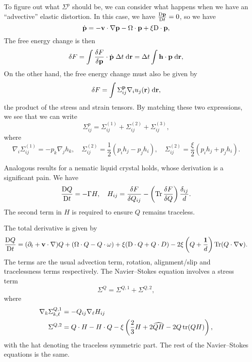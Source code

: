 \documentclass[a4paper]{article}
\begin{document}
To figure out what $\Sigma^p$ should be, we can consider what happens when we have an ``advective'' elastic distortion. In this case, we have $\frac{\mathrm{D} \mathbf{p}}{\mathrm{D} t} = 0$, so we have
\[
  \dot{\mathbf{p}} = - \mathbf{v} \cdot \nabla \mathbf{p} - \Omega \cdot \mathbf{p} + \xi \mathrm{D} \cdot \mathbf{p},
\]
The free energy change is then
\[
  \delta F = \int \frac{\delta F}{\delta \mathbf{p}} \cdot \dot{\mathbf{p}}\; \Delta t \;\mathrm{d} \mathbf{r} = \Delta t \int \mathbf{h} \cdot \mathbf{p} \;\mathrm{d} \mathbf{r},
\]
On the other hand, the free energy change must also be given by
\[
  \delta F = \int \Sigma_{ij}^{\mathbf{p}} \nabla_i u_j(\mathbf{r}) \;\mathrm{d} \mathbf{r},
\]
the product of the stress and strain tensors. By matching these two expressions, we see that we can write
\[
  \Sigma_{ij}^p = \Sigma_{ij}^{(1)} + \Sigma_{ij}^{(2)} + \Sigma_{ij}^{(3)},
\]
where
\[
  \nabla_i \Sigma_{ij}^{(1)} = - p_k \nabla_j h_k,\quad
  \Sigma_{ij}^{(2)} = \frac{1}{2} (p_i h_j - p_j h_i),\quad
  \Sigma_{ij}^{(2)} = \frac{\xi}{2} (p_i h_j + p_j h_i).
\]

Analogous results for a nematic liquid crystal holds, whose derivation is a significant pain. We have
\[
  \frac{\mathrm{D} Q}{\mathrm{D} t} = - \Gamma H,\quad H_{ij} = \frac{\delta F}{\delta Q_{ij}} - \left( \operatorname{Tr}\frac{\delta F}{\delta Q}\right) \frac{\delta_{ij}}{d}.
\]
The second term in $H$ is required to ensure $Q$ remains traceless.

The total derivative is given by
\[
  \frac{\mathrm{D} Q}{\mathrm{D} t} = (\partial_t + \mathbf{v} \cdot \nabla) Q + (\Omega \cdot Q - Q \cdot \omega) + \xi (\mathrm{D} \cdot Q + Q \cdot D) - 2\xi \left(Q + \frac{\mathbf{1}}{d}\right) \operatorname{Tr}(Q \cdot \nabla \mathbf{v}).
\]
The terms are the usual advection term, rotation, alignment/slip and tracelessness terms respectively. The Navier--Stokes equation involves a stress term
\[
  \Sigma^Q = \Sigma^{Q, 1} + \Sigma^{Q, 2},
\]
where
\begin{align*}
  \nabla_k \Sigma^{Q, 1}_{k, \ell} &= - Q_{ij} \nabla_\ell H_{ij}\\
  \Sigma^{Q, 2} &= Q \cdot H - H \cdot Q - \xi \left(\frac{2}{3} H + 2 \widehat{QH} - 2 Q \operatorname{tr} (Q H)\right),
\end{align*}
with the hat denoting the traceless symmetric part. The rest of the Navier--Stokes equations is the same.
\end{document}
